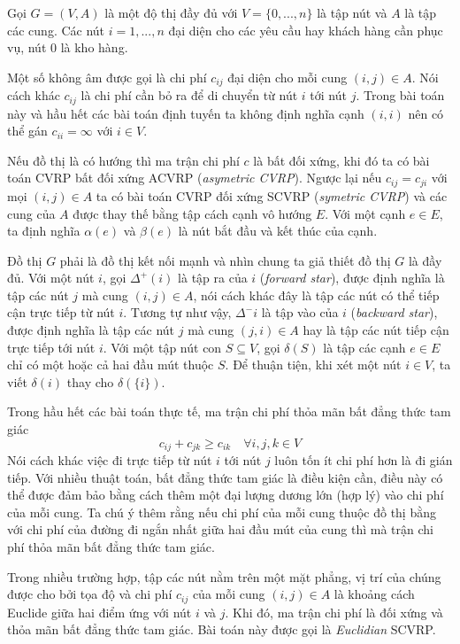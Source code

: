 Gọi $G=(V,A)$ là một độ thị đầy đủ với $V=\{ 0, ..., n \}$ là tập nút và $A$ là tập các cung. Các nút $i=1,...,n$ đại diện cho các yêu cầu hay khách hàng cần phục vụ, nút $0$ là kho hàng. 

Một số không âm được gọi là chi phí $c_{ij}$ đại diện cho mỗi cung $(i,j) \in A$. Nói cách khác $c_{ij}$ là  chi phí cần bỏ ra để di chuyển từ nút $i$ tới nút $j$. Trong bài toán này và hầu hết các bài toán định tuyến ta không định nghĩa cạnh $(i,i)$ nên có thể gán $c_{ii} = \infty$ với $i \in V$.

Nếu đồ thị là có hướng thì ma trận chi phí $c$ là bất đối xứng, khi đó ta có bài toán CVRP bất đối xứng ACVRP (\textit{asymetric CVRP}). Ngược lại nếu $c_{ij} = c_{ji}$ với mọi $(i,j) \in A$ ta có bài toán CVRP đối xứng SCVRP (\textit{symetric CVRP}) và các cung của $A$ được thay thế bằng tập cách cạnh vô hướng $E$. Với một cạnh $e \in E$, ta định nghĩa $\alpha(e)$ và $\beta(e)$ là nút bắt đầu và kết thúc của cạnh. 

Đồ thị $G$ phải là đồ thị kết nối mạnh và nhìn chung ta giả thiết đồ thị $G$ là đầy đủ. Với một nút $i$, gọi $\Delta^+(i)$ là tập ra của $i$ (\textit{forward star}), được định nghĩa là tập các nút $j$ mà cung $(i,j) \in A$, nói cách khác đây là tập các nút có thể tiếp cận trực tiếp từ nút $i$. Tương tự như vậy, $\Delta^-{i}$ là tập vào của $i$ (\textit{backward star}), được định nghĩa là tập các nút $j$ mà cung $(j,i) \in A$ hay là tập các nút tiếp cận trực tiếp tới nút $i$. Với một tập nút con $S \subseteq V$, gọi $\delta(S)$ là tập các cạnh $e \in E$ chỉ có một hoặc cả hai đầu mút thuộc $S$. Để thuận tiện, khi xét một nút $i \in V$, ta viết $\delta(i)$ thay cho $\delta(\{i\})$.

Trong hầu hết các bài toán thực tế, ma trận chi phí thỏa mãn bất đẳng thức tam giác 
\begin{equation}
    c_{ij} + c_{jk} \geq c_{ik} \quad \forall i,j,k \in V
\end{equation}
Nói cách khác việc đi trực tiếp từ nút $i$ tới nút $j$ luôn tốn ít chi phí hơn là đi gián tiếp. Với nhiều thuật toán, bất đẳng thức tam giác là điều kiện cần, điều này có thể được đảm bảo bằng cách thêm một đại lượng dương lớn (hợp lý) vào chi phí của mỗi cung. Ta chú ý thêm rằng nếu chi phí của mỗi cung thuộc đồ thị bằng với chi phí của đường đi ngắn nhất giữa hai đầu mút của cung thì mà trận chi phí thỏa mãn bất đẳng thức tam giác.

Trong nhiều trường hợp, tập các nút nằm trên một mặt phẳng, vị trí của chúng được cho bởi tọa độ và chi phí $c_{ij}$ của mỗi cung $(i,j) \in A$ là khoảng cách Euclide giữa hai điểm ứng với nút $i$ và $j$. Khi đó, ma trận chi phí là đối xứng và thỏa mãn bất đẳng thức tam giác. Bài toán này được gọi là \textit{Euclidian} SCVRP.

